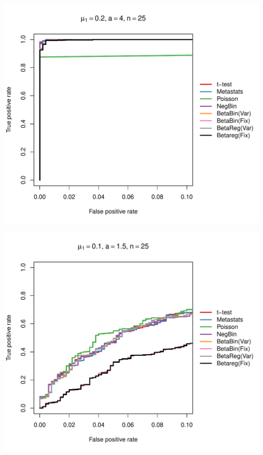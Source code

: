 \documentclass[12pt]{article}\usepackage{graphicx, color}
\makeatletter
\def\maxwidth{ %
  \ifdim\Gin@nat@width>\linewidth
    \linewidth
  \else
    \Gin@nat@width
  \fi
}
\newenvironment{knitrout}{}{} %
\makeatother
\begin{document}
\begin{knitrout}
{\centering \includegraphics[width=\maxwidth]{figure/rocs63} 

}




{\centering \includegraphics[width=\maxwidth]{figure/rocs64} 

}





\end{knitrout}
\end{document}
